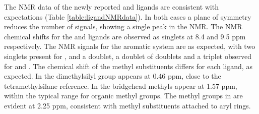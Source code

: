 

The NMR data of the newly reported \tButhixantphos{} and \tBusixantphos{} ligands are consistent with expectations (Table \ref{table:ligandNMRdata}).  In both cases a plane of symmetry reduces the number of signals, showing a single peak in the \phosphorus{} NMR.  The \phosphorus{} NMR chemical shifts for the \tBusixantphos{} and \tButhixantphos{} ligands are observed as singlets at 8.4 and 9.5 ppm respectively.  The \proton{} NMR signals for the aromatic system are as expected, with two singlets present for \tButhixantphos, and a doublet, a doublet of doublets and a triplet observed for \tBusixantphos{} and \tBuxantphos.  The chemical shift of the methyl substituents differs for each ligand, as expected.  In \tBusixantphos{} the dimethylsilyl group appears at 0.46 ppm, close to the tetramethylsilane reference.  In \tBuxantphos{} the bridgehead methyls appear at 1.57 ppm, within the typical range for organic methyl groups.  The methyl groups in \tButhixantphos{} are evident at 2.25 ppm, consistent with methyl substituents attached to aryl rings.  

